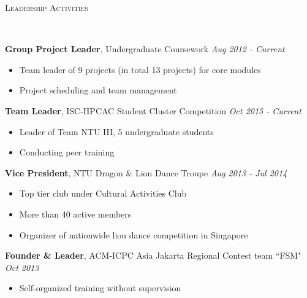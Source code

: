 \documentclass[a4paper, 12pt]{article}
\newenvironment{changemargin}[2]{%
  \begin{list}{}{%
      \setlength{\topsep}{0pt}%
      \setlength{\leftmargin}{#1}%
      \setlength{\rightmargin}{#2}%
      \setlength{\listparindent}{\parindent}%
      \setlength{\itemindent}{\parindent}%
      \setlength{\parsep}{\parskip}%
    }%
  \item[]}{\end{list}
}
\newcommand{\lineover}{
  \begin{changemargin}{-0.05in}{-0.05in}
    \vspace*{-8pt}
    \hrulefill \\
    \vspace*{-2pt}
  \end{changemargin}
}
\newcommand{\header}[1]{
  \begin{changemargin}{-0.6in}{-0.6in}
    \fontsize{15}{15}\scshape{#1}\\
    \lineover
    \vspace*{-4pt}
  \end{changemargin}
}
\newenvironment{body}
{
\vspace*{-16pt}
\begin{changemargin}{-0.25in}{-0.5in}
}
{
\end{changemargin}
}
\begin{document}
% 
\header{Leadership Activities}
\begin{body}
  \vspace{14pt}
  \textbf{Group Project Leader}, {Undergraduate Coursework} \hfill \emph{Aug 2012 - Current} \\
  \vspace*{-6pt}
  \begin{itemize} \itemsep -0pt \small
    \item Team leader of 9 projects (in total 13 projects) for core modules
    \item Project scheduling and team management
  \end{itemize}

  \textbf{Team Leader}, {ISC-HPCAC Student Cluster Competition} \hfill \emph{Oct 2015 - Current}\\
  \vspace*{-6pt}
  \begin{itemize} \itemsep -0pt \small
    \item Leader of Team NTU III, 5 undergraduate students
    \item Conducting peer training
  \end{itemize}

  \textbf{Vice President}, NTU Dragon \& Lion Dance Troupe \hfill {} \emph{Aug 2013 - Jul 2014}\\
  \vspace*{-6pt}
  \begin{itemize} \itemsep -0pt \small
    \item Top tier club under Cultural Activities Club
    \item More than 40 active members
    \item Organizer of nationwide lion dance competition in Singapore
  \end{itemize}

  \textbf{Founder \& Leader}, ACM-ICPC Asia Jakarta Regional Contest team ``FSM" \hfill {} \emph{Oct 2013}\\
  \vspace*{-6pt}
  \begin{itemize} \itemsep -0pt \small
    \item Self-organized training without supervision
  \end{itemize}
\end{body}
% 
%
%
\end{document}
